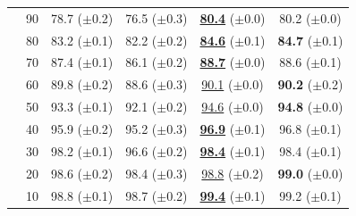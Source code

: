 \begin{table}[h!]
{\begin{tabular}{cccccc}
& 90  & 78.7 ($\pm$0.2) & 76.5 ($\pm$0.3) & \underline{\textbf{80.4}} ($\pm$0.0) & 80.2 ($\pm$0.0) \\
& 80  & 83.2 ($\pm$0.1) & 82.2 ($\pm$0.2) & \underline{\textbf{84.6}} ($\pm$0.1) & \textbf{84.7} ($\pm$0.1) \\
& 70  & 87.4 ($\pm$0.1) & 86.1 ($\pm$0.2) & \underline{\textbf{88.7}} ($\pm$0.0) & 88.6 ($\pm$0.1) \\
& 60  & 89.8 ($\pm$0.2) & 88.6 ($\pm$0.3) & \underline{90.1} ($\pm$0.0) & \textbf{90.2} ($\pm$0.2) \\
& 50  & 93.3 ($\pm$0.1) & 92.1 ($\pm$0.2) & \underline{94.6} ($\pm$0.0) & \textbf{94.8} ($\pm$0.0) \\
& 40  & 95.9 ($\pm$0.2) & 95.2 ($\pm$0.3) & \underline{\textbf{96.9}} ($\pm$0.1) & 96.8 ($\pm$0.1) \\
& 30  & 98.2 ($\pm$0.1) & 96.6 ($\pm$0.2) & \underline{\textbf{98.4}} ($\pm$0.1) & 98.4 ($\pm$0.1) \\
& 20  & 98.6 ($\pm$0.2) & 98.4 ($\pm$0.3) & \underline{98.8} ($\pm$0.2) & \textbf{99.0} ($\pm$0.0) \\
& 10  & 98.8 ($\pm$0.1) & 98.7 ($\pm$0.2) & \underline{\textbf{99.4}} ($\pm$0.1) & 99.2 ($\pm$0.1) \\
\bottomrule
\end{tabular}
}
\end{table}



